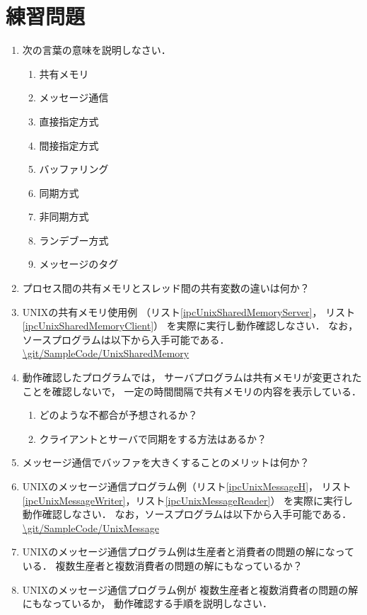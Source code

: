 \section*{練習問題}
\begin{enumerate}
  \renewcommand{\labelenumi}{\ttfamily\arabic{chapter}.\arabic{enumi}}
  \setlength{\leftskip}{1em}
\item 次の言葉の意味を説明しなさい．
  \begin{enumerate}
  \item 共有メモリ
  \item メッセージ通信
  \item 直接指定方式
  \item 間接指定方式
  \item バッファリング
  \item 同期方式
  \item 非同期方式
  \item ランデブー方式
  \item メッセージのタグ
  \end{enumerate}
\item プロセス間の共有メモリとスレッド間の共有変数の違いは何か？
\item UNIXの共有メモリ使用例
  （リスト\ref{ipcUnixSharedMemoryServer}，
    リスト\ref{ipcUnixSharedMemoryClient}）
  を実際に実行し動作確認しなさい．
  なお，ソースプログラムは以下から入手可能である． \\
  \url{\git/SampleCode/UnixSharedMemory}
\item 動作確認したプログラムでは，
  サーバプログラムは共有メモリが変更されたことを確認しないで，
  一定の時間間隔で共有メモリの内容を表示している．
  \begin{enumerate}
  \item どのような不都合が予想されるか？
  \item クライアントとサーバで同期をする方法はあるか？
  \end{enumerate}
\item メッセージ通信でバッファを大きくすることのメリットは何か？
\item UNIXのメッセージ通信プログラム例（リスト\ref{ipcUnixMessageH}，
  リスト\ref{ipcUnixMessageWriter}，リスト\ref{ipcUnixMessageReader}）
  を実際に実行し動作確認しなさい．
  なお，ソースプログラムは以下から入手可能である． \\
  \url{\git/SampleCode/UnixMessage}
\item UNIXのメッセージ通信プログラム例は生産者と消費者の問題の解になっている．
  複数生産者と複数消費者の問題の解にもなっているか？
\item UNIXのメッセージ通信プログラム例が
  複数生産者と複数消費者の問題の解にもなっているか，
  動作確認する手順を説明しなさい．
\end{enumerate}
